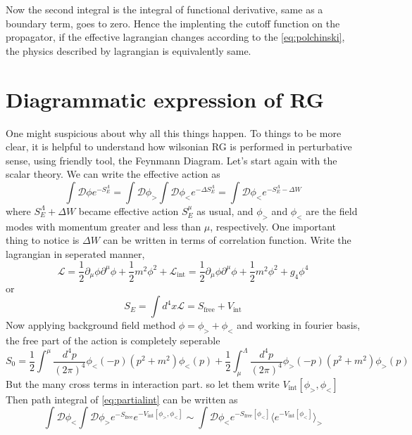 \documentclass[12pt,halfline,a4paper]{ouparticle}
\begin{document}
Now the second integral is the integral of functional derivative, same as a boundary term, goes to zero. Hence the implenting the cutoff function on the propagator, if the effective lagrangian changes according to the \ref{eq:polchinski}, the physics described by lagrangian is equivalently same.

\section{Diagrammatic expression of RG}
\label{sec3}
One might suspicious about why all this things happen. To things to be more clear, it is helpful to understand how wilsonian RG is performed in perturbative sense, using friendly tool,
the Feynmann Diagram.
Let's start again with the scalar theory. We can write the effective action as
\begin{equation}
	\label{eq:partialint}
\int \mathcal D \phi e^{-S_E^\Lambda}=\int \mathcal D \phi_> \int \mathcal D \phi_< e^{-\Delta S_E^\Lambda}=\int \mathcal D \phi_< e^{-S_E^{\Lambda}-\Delta W}
\end{equation}
where $S_E^\Lambda+\Delta W$ became effective action $S_E^\mu$ as usual, and $\phi_>$ and $\phi_<$ are the field modes with momentum greater and less than $\mu$, respectively.
One important thing to notice is $\Delta W$ can be written in terms of correlation function. Write the lagrangian in seperated manner,
\begin{equation}
	\mathcal L=\frac{1}{2}\partial_\mu\phi\partial^\mu\phi +\frac{1}{2}m^2\phi^2 +\mathcal L_{\text{int}}=\frac{1}{2}\partial_\mu\phi\partial^\mu\phi +\frac{1}{2}m^2\phi^2 + g_4\phi^4 
\end{equation}
or 
\begin{equation}
	S_E = \int d^4x \mathcal L = S_\text{free}+V_\text{int}
\end{equation}
Now applying background field method $\phi=\phi_>+\phi_<$ and working in fourier basis, the free part of the action is completely seperable
\begin{equation}
	\label{eq:sepaction}
	S_0 = \frac{1}{2}\int^\mu \frac{d^4p}{(2\pi)^4}\phi_<(-p)(p^2+m^2)\phi_<(p)+\frac{1}{2}\int^\Lambda_\mu \frac{d^4p}{(2\pi)^4}\phi_>(-p)(p^2+m^2)\phi_>(p)
\end{equation}
But the many cross terms in interaction part. so let them write $V_\text{int}[\phi_>,\phi_<]$
Then path integral of \ref{eq:partialint} can be written as
\begin{equation}
	\int \mathcal D \phi_<\int \mathcal D \phi_> e^{-S_\text{free}}e^{-V_\text{int}[\phi_>,\phi_<]}\sim\int \mathcal D \phi_< e^{-S_\text{free}[\phi_<]}\langle e^{-V_\text{int}[\phi_<]}\rangle_>
	\end{equation}
\end{document}

